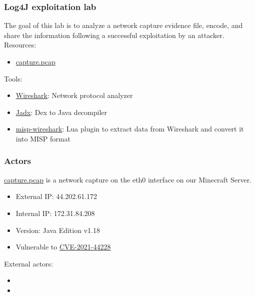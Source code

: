 
\begin{frame}[t,plain]
\titlepage
\end{frame}

\begin{frame}
    \frametitle{Log4J exploitation lab}
    The goal of this lab is to analyze a network capture evidence file, encode, and share the information following a successful exploitation by an attacker.
	\linebreak
	\linebreak
	\linebreak
    Resources:
    \begin{itemize}
        \item \href{https://github.com/MISP/misp-training-lea/tree/main/e.304-lab3-encoding-information-and-sharing-it-2/dataset/capture.pcap}{\underline{capture.pcap}}
    \end{itemize}
    Tools:
    \begin{itemize}
        \item \href{https://www.wireshark.org/}{\underline{Wireshark}}: Network protocol analyzer
        \item \href{https://github.com/skylot/jadx}{\underline{Jadx}}: Dex to Java decompiler
        \item \href{https://github.com/MISP/misp-wireshark}{\underline{misp-wireshark}}: Lua plugin to extract data from Wireshark and convert it into MISP format 
    \end{itemize}

    \note[item]{}
\end{frame}

\begin{frame}
    \frametitle{Actors}
    \href{https://github.com/MISP/misp-training-lea/tree/main/e.304-lab3-encoding-information-and-sharing-it-2/dataset/capture.pcap}{\underline{capture.pcap}} is a network capture on the eth0 interface on our Minecraft Server.
    \linebreak
    \linebreak
    {\color{blue}{\bf Minecraft Server}}
    \begin{itemize}
    	\item External IP: 44.202.61.172
	    \item Internal IP: 172.31.84.208
	    \item Version: Java Edition v1.18 
	    \item Vulnerable to \href{https://nvd.nist.gov/vuln/detail/CVE-2021-44228}{CVE-2021-44228}
    \end{itemize}
    
    External actors:
    \begin{itemize}
        \item {\color{green}{\bf Player}}
        \item {\color{red}{\bf Attacker}}
    \end{itemize}

    \note[item]{}
\end{frame}

